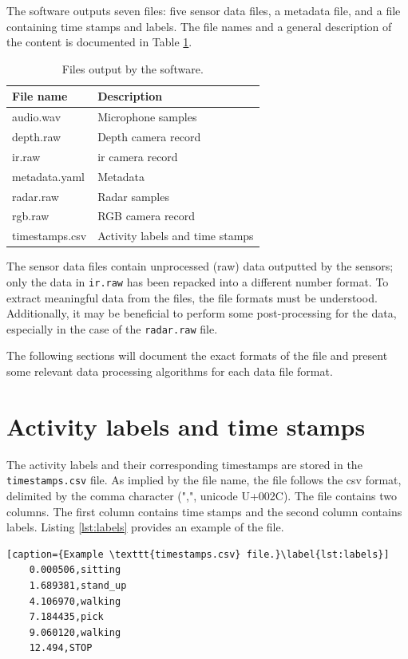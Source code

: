 The software outputs seven files: five sensor data files, a metadata file, and a file containing time stamps and labels.
The file names and a general description of the content is documented in Table \ref{tab:3-files}.

\begin{table}[H]
    \centering
    \begin{tabular}{l l}
    \toprule
    \textbf{File name} & \textbf{Description} \\
    \midrule
    audio.wav & Microphone samples \\
    depth.raw & Depth camera record \\
    ir.raw & \gls{ir} camera record \\
    metadata.yaml & Metadata \\
    radar.raw & Radar samples \\
    rgb.raw & RGB camera record \\
    timestamps.csv & Activity labels and time stamps \\
    \bottomrule
    \end{tabular}
    \caption{Files output by the software.}
    \label{tab:3-files}
\end{table}

The sensor data files contain unprocessed (raw) data outputted by the sensors;
only the data in \texttt{ir.raw} has been repacked into a different number format.
To extract meaningful data from the files, the file formats must be understood.
Additionally, it may be beneficial to perform some post-processing for the data,
especially in the case of the \texttt{radar.raw} file.

The following sections will document the exact formats of the file
and present some relevant data processing algorithms for each data file format.

\section{Activity labels and time stamps}
The activity labels and their corresponding timestamps are stored in the \texttt{timestamps.csv} file.
As implied by the file name, the file follows the \gls{csv} format, delimited by the comma character (",", unicode U+002C).
The file contains two columns.
The first column contains time stamps and the second column contains labels.
Listing \ref{lst:labels} provides an example of the file.

\begin{lstlisting}[caption={Example \texttt{timestamps.csv} file.}\label{lst:labels}]
    0.000506,sitting
    1.689381,stand_up
    4.106970,walking
    7.184435,pick
    9.060120,walking
    12.494,STOP
\end{lstlisting}

